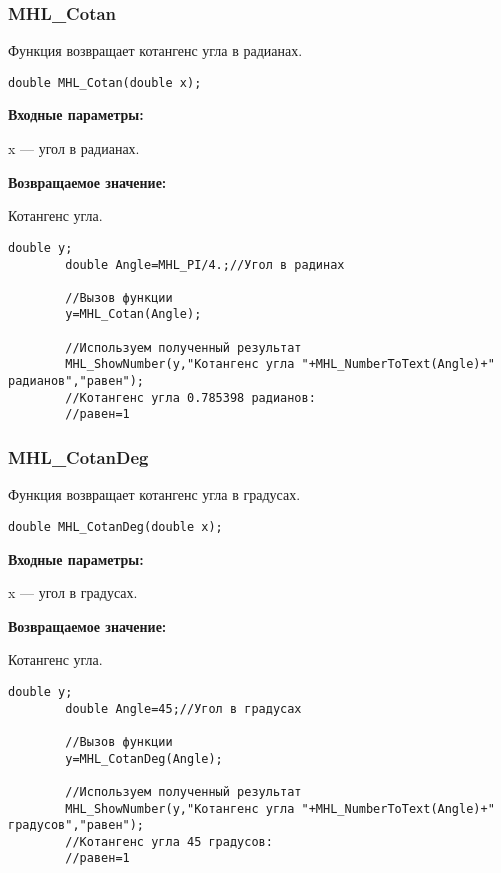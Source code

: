 \documentclass[a4paper,12pt]{article}
\begin{document}
\subsubsection{MHL\_Cotan}\label{MHL_Cotan}

Функция возвращает котангенс угла в радианах.


\begin{lstlisting}[label=code_syntax_MHL_Cotan,caption=Синтаксис]
double MHL_Cotan(double x);
\end{lstlisting}

\textbf{Входные параметры:}

 x --- угол в радианах.

\textbf{Возвращаемое значение:}

Котангенс угла.


\begin{lstlisting}[label=code_use_MHL_Cotan,caption=Пример использования]
        double y;
        double Angle=MHL_PI/4.;//Угол в радинах

        //Вызов функции
        y=MHL_Cotan(Angle);

        //Используем полученный результат
        MHL_ShowNumber(y,"Котангенс угла "+MHL_NumberToText(Angle)+" радианов","равен");
        //Котангенс угла 0.785398 радианов:
        //равен=1
\end{lstlisting}

\subsubsection{MHL\_CotanDeg}\label{MHL_CotanDeg}

Функция возвращает котангенс угла в градусах.


\begin{lstlisting}[label=code_syntax_MHL_CotanDeg,caption=Синтаксис]
double MHL_CotanDeg(double x);
\end{lstlisting}

\textbf{Входные параметры:}

 x --- угол в градусах.

\textbf{Возвращаемое значение:}

Котангенс угла.


\begin{lstlisting}[label=code_use_MHL_CotanDeg,caption=Пример использования]
        double y;
        double Angle=45;//Угол в градусах

        //Вызов функции
        y=MHL_CotanDeg(Angle);

        //Используем полученный результат
        MHL_ShowNumber(y,"Котангенс угла "+MHL_NumberToText(Angle)+" градусов","равен");
        //Котангенс угла 45 градусов:
        //равен=1
\end{lstlisting}
\end{document}
